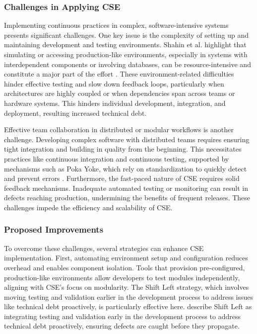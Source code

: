 \subsubsection{Challenges in Applying CSE}\label{CSE_challenges}
Implementing continuous practices in complex, software-intensive systems presents significant challenges. One key issue is the complexity of setting up and maintaining development and testing environments. Shahin et al. highlight that simulating or accessing production-like environments, especially in systems with interdependent components or involving databases, can be resource-intensive and constitute a major part of the effort \citep{shahin2017continuous}. These environment-related difficulties hinder effective testing and slow down feedback loops, particularly when architectures are highly coupled or when dependencies span across teams or hardware systems. This hinders individual development, integration, and deployment, resulting increased technical debt.

Effective team collaboration in distributed or modular workflows is another challenge. Developing complex software with distributed teams requires ensuring tight integration and building in quality from the beginning. This necessitates practices like continuous integration and continuous testing, supported by mechanisms such as Poka Yoke, which rely on standardization to quickly detect and prevent errors \citep{fitzgerald2015continuous}. Furthermore, the fast-paced nature of CSE requires solid feedback mechanisms. Inadequate automated testing or monitoring can result in defects reaching production, undermining the benefits of frequent releases. These challenges impede the efficiency and scalability of CSE.

\subsubsection{Proposed Improvements} \label{CSE_improvements}
To overcome these challenges, several strategies can enhance CSE implementation. First, automating environment setup and configuration reduces overhead and enables component isolation. Tools that provision pre-configured, production-like environments allow developers to test modules independently, aligning with CSE’s focus on modularity. The Shift Left strategy, which involves moving testing and validation earlier in the development process to address issues like technical debt proactively, is particularly effective here. \citet{fitzgerald2015continuous} describe Shift Left as integrating testing and validation early in the development process to address technical debt proactively, ensuring defects are caught before they propagate.


